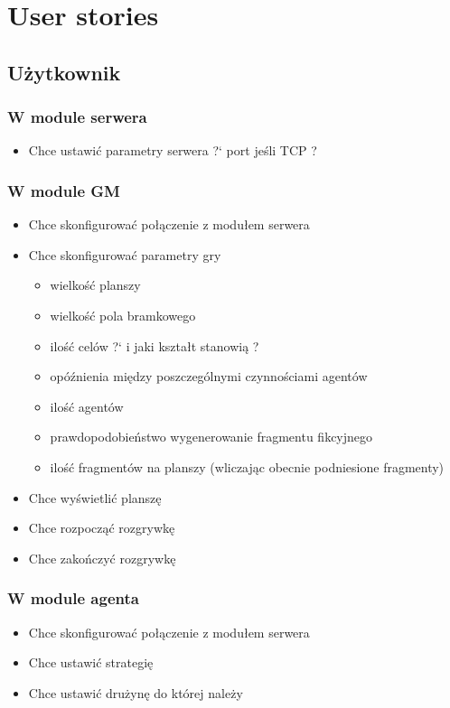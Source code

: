 \documentclass[Dokumentacja.tex]{subfiles}
\begin{document}
\section{User stories}
\subsection{Użytkownik}
\subsubsection{W module serwera}
\begin{itemize}
    \item Chce ustawić parametry serwera ?` port jeśli TCP ?
\end{itemize}

\subsubsection{W module GM}
\begin{itemize}
    \item Chce skonfigurować połączenie z modułem serwera
    \item Chce skonfigurować parametry gry
    \begin{itemize}
        \item wielkość planszy
        \item wielkość pola bramkowego
        \item ilość celów ?` i jaki kształt stanowią ?
        \item opóźnienia między poszczególnymi czynnościami agentów
        \item ilość agentów
        \item prawdopodobieństwo wygenerowanie fragmentu fikcyjnego
        \item ilość fragmentów na planszy (wliczając obecnie podniesione fragmenty)
    \end{itemize}
    \item Chce wyświetlić planszę
    \item Chce rozpocząć rozgrywkę
    \item Chce zakończyć rozgrywkę
\end{itemize}


\subsubsection{W module agenta}
\begin{itemize}
    \item Chce skonfigurować połączenie z modułem serwera
    \item Chce ustawić strategię
    \item Chce ustawić drużynę do której należy
\end{itemize}
\end{document}
